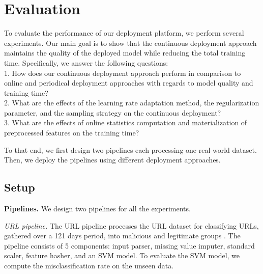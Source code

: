 \section{Evaluation} \label{evaluation} 
To evaluate the performance of our deployment platform, we perform several experiments.
Our main goal is to show that the continuous deployment approach maintains the quality of the deployed model while reducing the total training time.
Specifically, we answer the following questions:\\
1. How does our continuous deployment approach perform in comparison to online and periodical deployment approaches with regards to model quality and training time? \\
2. What are the effects of the learning rate adaptation method, the regularization parameter, and the sampling strategy on the continuous deployment? \\
3. What are the effects of online statistics computation and materialization of preprocessed features on the training time?

To that end, we first design two pipelines each processing one real-world dataset.
Then, we deploy the pipelines using different deployment approaches.

\subsection{Setup}\label{subsec:setup}
\textbf{Pipelines.}
We design two pipelines for all the experiments.

\textit{URL pipeline.} The URL pipeline processes the URL dataset for classifying URLs, gathered over a 121 days period, into malicious and legitimate groups \cite{ma2009identifying}.
The pipeline consists of 5 components: input parser, missing value imputer, standard scaler, feature hasher, and an SVM model.
To evaluate the SVM model, we compute the misclassification rate on the unseen data.

